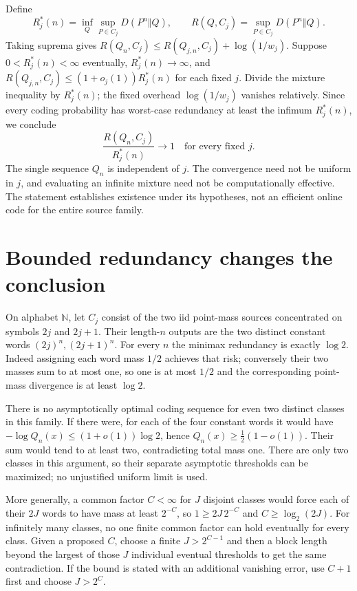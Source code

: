 \documentclass[11pt]{article}
\begin{document}
Define
\[
R_j^*(n)=\inf_Q\sup_{P\in C_j}D(P^n\Vert Q),
\qquad R(Q,C_j)=\sup_{P\in C_j}D(P^n\Vert Q).
\]
Taking suprema gives
$R(Q_n,C_j)\le R(Q_{j,n},C_j)+\log(1/w_j)$.
Suppose $0<R_j^*(n)<\infty$ eventually,
$R_j^*(n)\to\infty$, and
$R(Q_{j,n},C_j)\le(1+o_j(1))R_j^*(n)$ for each fixed $j$.
Divide the mixture inequality by $R_j^*(n)$; the fixed overhead
$\log(1/w_j)$ vanishes relatively. Since every coding probability
has worst-case redundancy at least the infimum $R_j^*(n)$, we conclude
\[
\frac{R(Q_n,C_j)}{R_j^*(n)}\longrightarrow1
\quad\text{for every fixed }j.
\]
The single sequence $Q_n$ is independent of $j$. The convergence need
not be uniform in $j$, and evaluating an infinite mixture need not be
computationally effective. The statement establishes existence under
its hypotheses, not an efficient online code for the entire source family.

\section{Bounded redundancy changes the conclusion}
On alphabet $\mathbb N$, let $C_j$ consist of the two iid point-mass
sources concentrated on symbols $2j$ and $2j+1$. Their length-$n$
outputs are the two distinct constant words $(2j)^n,(2j+1)^n$.
For every $n$ the minimax redundancy is exactly $\log2$.
Indeed assigning each word mass $1/2$ achieves that risk; conversely
their two masses sum to at most one, so one is at most $1/2$ and the
corresponding point-mass divergence is at least $\log2$.

There is no asymptotically optimal coding sequence for even two
distinct classes in this family. If there were, for each of the four
constant words it would have
$-\log Q_n(x)\le(1+o(1))\log2$, hence
$Q_n(x)\ge\tfrac12(1-o(1))$. Their sum would tend to at least two,
contradicting total mass one. There are only two classes in this
argument, so their separate asymptotic thresholds can be maximized;
no unjustified uniform limit is used.

More generally, a common factor $C<\infty$ for $J$ disjoint classes
would force each of their $2J$ words to have mass at least $2^{-C}$,
so $1\ge2J\,2^{-C}$ and $C\ge\log_2(2J)$.
For infinitely many classes, no one finite common factor can hold
eventually for every class. Given a proposed $C$, choose a finite
$J>2^{C-1}$ and then a block length beyond the largest of those
$J$ individual eventual thresholds to get the same contradiction.
If the bound is stated with an additional vanishing error, use
$C+1$ first and choose $J>2^C$.
\end{document}
